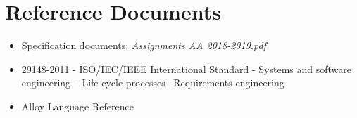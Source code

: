 \section{Reference Documents}
\begin{itemize}

\item Specification documents: \emph{Assignments AA 2018-2019.pdf}

\item 29148-2011 - ISO/IEC/IEEE International Standard - Systems and software engineering -- Life cycle processes --Requirements engineering

\item Alloy Language Reference
\end{itemize}